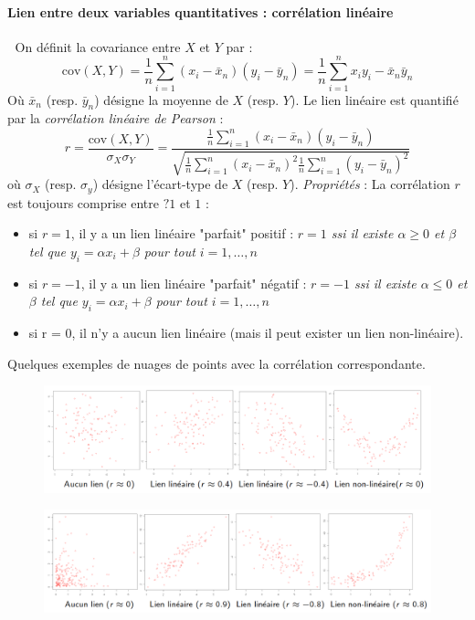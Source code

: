 \paragraph{Lien entre deux variables quantitatives : corrélation linéaire}\textcolor{white}{.}\newline
On définit la covariance entre $X$ et $Y$ par :
$$\textrm{cov}(X,Y) = \frac{1}{n}\sum_{i=1}^{n}(x_{i}-\bar{x}_{n})(y_{i}-\bar{y}_{n})=\frac{1}{n}\sum_{i=1}^{n}x_{i}y_{i} - \bar{x}_{n}\bar{y}_{n}$$ 
Où $\bar{x}_{n}$ (resp. $\bar{y}_{n}$) désigne la moyenne de $X$ (resp. $Y$).\newline
Le lien linéaire est quantifié par la \textit{corrélation linéaire de Pearson} :
$$r = \frac{\textrm{cov}(X,Y)}{\sigma_{X}\sigma_{Y}} = \frac{\frac{1}{n}\sum_{i=1}^{n}(x_{i}-\bar{x}_{n})(y_{i}-\bar{y}_{n})}{\sqrt{\frac{1}{n}\sum_{i=1}^{n}(x_{i}-\bar{x}_{n})^{2}\frac{1}{n}\sum_{i=1}^{n}(y_{i}-\bar{y}_{n})^{2}}}$$
où $\sigma_{X}$ (resp. $\sigma_{y}$) désigne l'écart-type de $X$ (resp. $Y$).\newline
\textit{Propriétés} : La corrélation $r$ est toujours comprise entre $?1$ et $1$ :
\begin{itemize}
\item si $r = 1$, il y a un lien linéaire "parfait" positif :\newline
\textit{$r = 1$ ssi il existe $\alpha\geq 0$ et $\beta$ tel que $y_{i} = \alpha x_{i} + \beta$ pour tout $i=1,\dots,n$}
\item si $r = -1$, il y a un lien linéaire "parfait" négatif :\newline
\textit{$r = -1$ ssi il existe $\alpha\leq 0$ et $\beta$ tel que $y_{i} = \alpha x_{i} + \beta$ pour tout $i=1,\dots,n$}
\item si r = 0, il n'y a aucun lien linéaire (mais il peut exister un lien non-linéaire).
\end{itemize}
Quelques exemples de nuages de points avec la corrélation correspondante.
\begin{figure}[H]\begin{center}\includegraphics[scale=0.7]{ilu/ccm18.png}\end{center}\end{figure}
\begin{figure}[H]\begin{center}\includegraphics[scale=0.7]{ilu/ccm19.png}\end{center}\end{figure}
